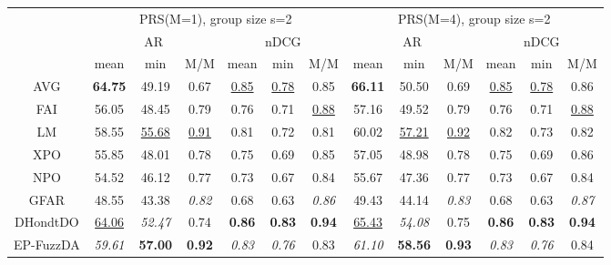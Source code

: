 \begin{tabular}{ c | c c c | c c c || c c c | c c c}

\multicolumn{1}{c}{} & \multicolumn{6}{c}{PRS(M=1), group size s=2} & \multicolumn{6}{c}{PRS(M=4), group size s=2} \\
\multicolumn{1}{c}{} & \multicolumn{3}{c}{AR} & \multicolumn{3}{c}{nDCG} & \multicolumn{3}{c}{AR} & \multicolumn{3}{c}{nDCG} \\
& mean & min & M/M & mean & min & M/M & mean & min & M/M & mean & min & M/M \\
\hline
AVG & \textbf{64.75} & 49.19 & 0.67 & \underline{0.85} & \underline{0.78} & 0.85 & \textbf{66.11} & 50.50 & 0.69 & \underline{0.85} & \underline{0.78} & 0.86 \\
FAI & 56.05 & 48.45 & 0.79 & 0.76 & 0.71 & \underline{0.88} & 57.16 & 49.52 & 0.79 & 0.76 & 0.71 & \underline{0.88} \\
LM & 58.55 & \underline{55.68} & \underline{0.91} & 0.81 & 0.72 & 0.81 & 60.02 & \underline{57.21} & \underline{0.92} & 0.82 & 0.73 & 0.82 \\
XPO & 55.85 & 48.01 & 0.78 & 0.75 & 0.69 & 0.85 & 57.05 & 48.98 & 0.78 & 0.75 & 0.69 & 0.86 \\
NPO & 54.52 & 46.12 & 0.77 & 0.73 & 0.67 & 0.84 & 55.67 & 47.36 & 0.77 & 0.73 & 0.67 & 0.84 \\
GFAR & 48.55 & 43.38 & \textit{0.82} & 0.68 & 0.63 & \textit{0.86} & 49.43 & 44.14 & \textit{0.83} & 0.68 & 0.63 & \textit{0.87} \\
DHondtDO & \underline{64.06} & \textit{52.47} & 0.74 & \textbf{0.86} & \textbf{0.83} & \textbf{0.94} & \underline{65.43} & \textit{54.08} & 0.75 & \textbf{0.86} & \textbf{0.83} & \textbf{0.94} \\
EP-FuzzDA & \textit{59.61} & \textbf{57.00} & \textbf{0.92} & \textit{0.83} & \textit{0.76} & 0.83 & \textit{61.10} & \textbf{58.56} & \textbf{0.93} & \textit{0.83} & \textit{0.76} & 0.84 \\


\end{tabular}
